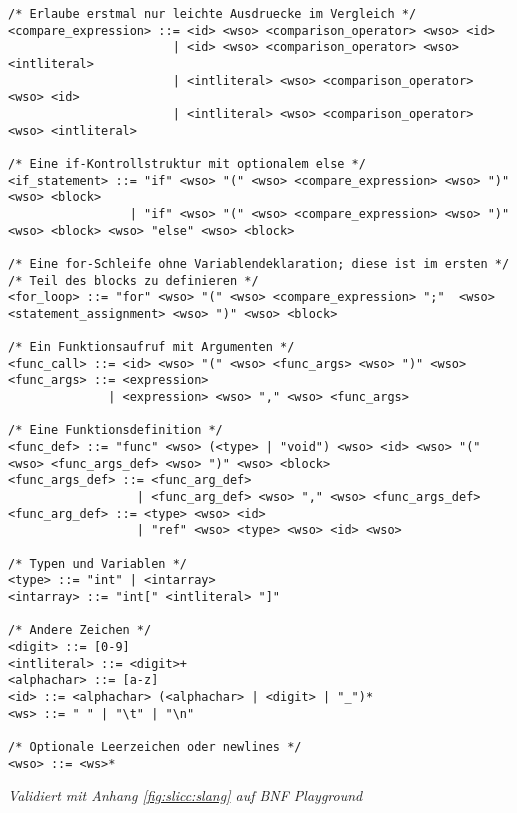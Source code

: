 \begin{lstlisting}
/* Erlaube erstmal nur leichte Ausdruecke im Vergleich */
<compare_expression> ::= <id> <wso> <comparison_operator> <wso> <id>
                       | <id> <wso> <comparison_operator> <wso> <intliteral>
                       | <intliteral> <wso> <comparison_operator> <wso> <id>
                       | <intliteral> <wso> <comparison_operator> <wso> <intliteral>

/* Eine if-Kontrollstruktur mit optionalem else */
<if_statement> ::= "if" <wso> "(" <wso> <compare_expression> <wso> ")" <wso> <block>
                 | "if" <wso> "(" <wso> <compare_expression> <wso> ")"  <wso> <block> <wso> "else" <wso> <block>

/* Eine for-Schleife ohne Variablendeklaration; diese ist im ersten */
/* Teil des blocks zu definieren */
<for_loop> ::= "for" <wso> "(" <wso> <compare_expression> ";"  <wso> <statement_assignment> <wso> ")" <wso> <block>

/* Ein Funktionsaufruf mit Argumenten */
<func_call> ::= <id> <wso> "(" <wso> <func_args> <wso> ")" <wso>
<func_args> ::= <expression>
              | <expression> <wso> "," <wso> <func_args>

/* Eine Funktionsdefinition */
<func_def> ::= "func" <wso> (<type> | "void") <wso> <id> <wso> "(" <wso> <func_args_def> <wso> ")" <wso> <block>
<func_args_def> ::= <func_arg_def>
                  | <func_arg_def> <wso> "," <wso> <func_args_def>
<func_arg_def> ::= <type> <wso> <id>
                  | "ref" <wso> <type> <wso> <id> <wso>

/* Typen und Variablen */
<type> ::= "int" | <intarray>
<intarray> ::= "int[" <intliteral> "]"

/* Andere Zeichen */
<digit> ::= [0-9]
<intliteral> ::= <digit>+
<alphachar> ::= [a-z]
<id> ::= <alphachar> (<alphachar> | <digit> | "_")*
<ws> ::= " " | "\t" | "\n"

/* Optionale Leerzeichen oder newlines */
<wso> ::= <ws>*

\end{lstlisting}
\hfil\textit{Validiert mit Anhang \ref{fig:slicc:slang} auf BNF Playground\cite{paulklineBNFPlayground}}\\
